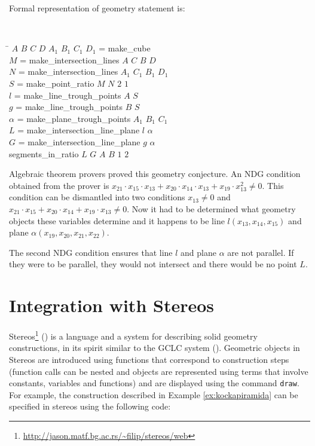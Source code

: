 \documentclass[final,1p,times,authoryear]{elsarticle}
\begin{document}
Formal representation of geometry statement is:
\begin{footnotesize}
{\tt
\begin{tabbing}
\hspace{5mm}\=\kill
\> $A$ $B$ $C$ $D$ $A_1$ $B_1$ $C_1$ $D_1$ = make\_cube\\
\> $M$ = make\_intersection\_lines $A$ $C$ $B$ $D$\\
\> $N$ = make\_intersection\_lines $A_1$ $C_1$ $B_1$ $D_1$\\
\> $S$ = make\_point\_ratio $M$ $N$ $2$ $1$\\ 
\> $l$ = make\_line\_trough\_points $A$ $S$ \\
\> $g$ = make\_line\_trough\_points $B$ $S$\\
\> $\alpha$ = make\_plane\_trough\_points $A_1$ $B_1$ $C_1$\\
\> $L$ = make\_intersection\_line\_plane $l$ $\alpha$\\
\> $G$ = make\_intersection\_line\_plane $g$ $\alpha$\\
\>segments\_in\_ratio $L$ $G$ $A$ $B$ $1$ $2$
\end{tabbing}
}
\end{footnotesize}

Algebraic theorem provers proved this geometry conjecture. An NDG
condition obtained from the prover is
$x_{21} \cdot x_{15} \cdot x_{13} + x_{20} \cdot x_{14} \cdot x_{13} +
x_{19} \cdot x_{13}^2 \neq 0$.
This condition can be dismantled into two conditions $x_{13} \neq 0$
and
$x_{21} \cdot x_{15} + x_{20} \cdot x_{14} + x_{19} \cdot x_{13} \neq
0$.
Now it had to be determined what geometry objects these variables
determine and it happens to be line $l(x_{13}, x_{14}, x_{15})$ and
plane $\alpha(x_{19}, x_{20}, x_{21}, x_{22})$.

The second NDG condition ensures that line $l$ and plane $\alpha$
are not parallel. If they were to be parallel, they would not
intersect and there would be no point $L$. 

\section{Integration with Stereos}

Stereos\footnote{\url{http://jason.matf.bg.ac.rs/~filip/stereos/web}}
(\cite{stereos}) is a language and a system for describing solid
geometry constructions, in its spirit similar to the GCLC system
(\cite{gclc}). Geometric objects in Stereos are introduced using
functions that correspond to construction steps (function calls can be
nested and objects are represented using terms that involve constants,
variables and functions) and are displayed using the command
\verb|draw|. For example, the construction described in Example
\ref{ex:kockapiramida} can be specified in stereos using the following
code:
\end{document}
